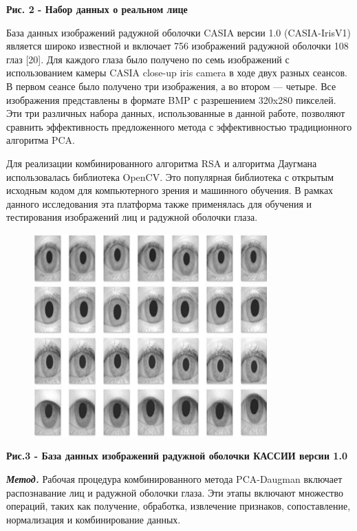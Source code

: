 {\bfseries Рис. 2 - Набор данных о реальном лице}

База данных изображений радужной оболочки CASIA версии 1.0
(CASIA-IrisV1) является широко известной и включает 756 изображений
радужной оболочки 108 глаз {[}20{]}. Для каждого глаза было получено по
семь изображений с использованием камеры CASIA close-up iris camera в
ходе двух разных сеансов. В первом сеансе было получено три изображения,
а во втором --- четыре. Все изображения представлены в формате BMP с
разрешением 320x280 пикселей. Эти три различных набора данных,
использованные в данной работе, позволяют сравнить эффективность
предложенного метода с эффективностью традиционного алгоритма PCA.

Для реализации комбинированного алгоритма RSA и алгоритма Даугмана
использовалась библиотека OpenCV. Это популярная библиотека с открытым
исходным кодом для компьютерного зрения и машинного обучения. В рамках
данного исследования эта платформа также применялась для обучения и
тестирования изображений лиц и радужной оболочки глаза.

\begin{figure}[H]
	\centering
	\includegraphics[width=0.8\textwidth]{assets/85}
	\caption*{}
\end{figure}

{\bfseries Рис.3 - База данных изображений радужной оболочки КАССИИ версии
1.0}

\emph{{\bfseries Метод.}} Рабочая процедура комбинированного метода
PCA-Daugman включает распознавание лиц и радужной оболочки глаза. Эти
этапы включают множество операций, таких как получение, обработка,
извлечение признаков, сопоставление, нормализация и комбинирование
данных.

